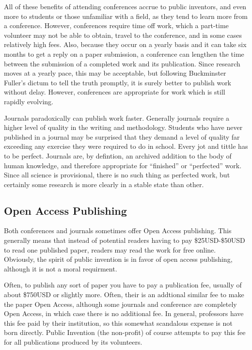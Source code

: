 \documentclass[
	fontsize=10pt, %
	twoside=false, %
	secnumdepth=1, %
]{kaobook}
\begin{document}
All of these benefits of attending conferences accrue to public inventors, and even more
to students or those unfamiliar with a field, as they tend to learn more from a conference.
However, conferences require time off work, which a part-time volunteer may not be able to obtain,
travel to the conference, and in some cases relatively high fees. Also, because
they occur on a yearly basis and it can take six months to get a reply on a paper submission,
a conference can lengthen the time between the submission of a completed work and its
publication. Since research moves at a yearly pace, this may be acceptable, but following
Buckminster Fuller's dictum to tell the truth promptly, it is surely better to publish
work without delay. However, conferences are appropriate for work which is still rapidly
evolving.

Journals paradoxically can publish work faster. Generally journals require a higher level
of quality in the writing and methodology. Students who have never published in a journal
may be surprised that they demand a level of quality far exceeding any exercise they
were required to do in school. Every jot and tittle has to be perfect.
Journals are, by defintion, an archived addition to the body of human
knowledge, and therefore appropriate for ``finished'' or ``perfected'' work. Since all
science is provisional, there is no such thing as perfected work, but certainly
some research is more clearly in a stable state than other.

\subsection{Open Access Publishing}

Both conferences and journals sometimes offer Open Access publishing. This generally means
that instead of potential readers having to pay \$25USD-\$50USD to read one published paper, readers
may read the work for free online. Obviously, the spirit of public invention is in favor
of open access publishing, although it is not a moral requirment.

Often, to publish any sort of paper you have to pay a publication fee, usually of about
\$750USD or slightly more. Often, their is an addtional similar fee to make the paper Open Access,
although some journals and conference are completely Open Access, in which case there is no additional fee.
In general, professors have this fee paid by their institution,
so this somewhat scandalous expense is not born directly. Public Invention (the non-profit) of
course attempts to pay this fee for all publications produced by its volunteers.
\end{document}
